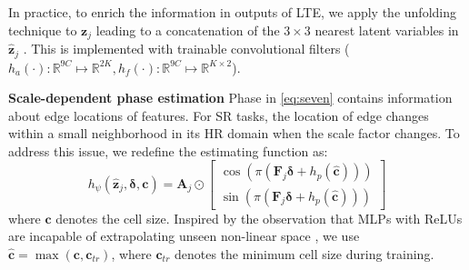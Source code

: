 \documentclass[10pt,twocolumn,letterpaper]{article}
\begin{document}
In practice, to enrich the information in outputs of LTE, we apply the unfolding technique to $\mathbf{z}_j$ leading to a concatenation of the $3\times 3$ nearest latent variables in $\hat{\mathbf{z}}_j$ \cite{chen2021learning}. This is implemented with trainable convolutional filters ($h_a(\cdot):\mathbb{R}^{9C}\mapsto \mathbb{R}^{2K},h_f(\cdot):\mathbb{R}^{9C}\mapsto \mathbb{R}^{K\times 2}$). 













{\bf Scale-dependent phase estimation} Phase in \cref{eq:seven} contains information about edge locations of features. For SR tasks, the location of edge changes within a small neighborhood in its HR domain when the scale factor changes. To address this issue, we redefine the estimating function as:
\begin{equation}
    h_\psi(\hat{\mathbf z}_j,\boldsymbol{\delta}, \mathbf c)=\mathbf{A}_j\odot\begin{bmatrix}
\cos(\pi(\mathbf{F}_j\boldsymbol{\delta}+h_p(\hat{\mathbf{c}})))\\
\sin(\pi(\mathbf{F}_j\boldsymbol{\delta}+h_p(\hat{\mathbf{c}})))
\end{bmatrix}
\label{eq:seven}
\end{equation}
where $\mathbf{c}$ denotes the cell size. Inspired by the observation that MLPs with ReLUs are incapable of extrapolating unseen non-linear space \cite{DBLP:conf/iclr/XuZLDKJ21}, we use $\hat{\mathbf{c}}=\max(\mathbf{c}, \mathbf{c}_{tr})$, where $\mathbf{c}_{tr}$ denotes the minimum cell size during training.
\end{document}
